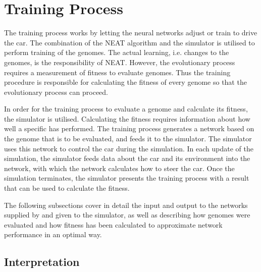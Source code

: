 \section{Training Process}
The training process works by letting the neural networks adjust or train to drive the car. The combination of the NEAT algorithm and the simulator is utilised to perform training of the genomes. The actual learning, i.e. changes to the genomes, is the responsibility of NEAT. However, the evolutionary process requires a measurement of fitness to evaluate genomes. Thus the training procedure is responsible for calculating the fitness of every genome so that the evolutionary process can proceed. 

In order for the training process to evaluate a genome and calculate its fitness, the simulator is utilised. Calculating the fitness requires information about how well a specific has performed. The training process generates a network based on the genome that is to be evaluated, and feeds it to the simulator. The simulator uses this network to control the car during the simulation. In each update of the simulation, the simulator feeds data about the car and its environment into the network, with which the network calculates how to steer the car. Once the simulation terminates, the simulator presents the training process with a result that can be used to calculate the fitness.

The following subsections cover in detail the input and output to the networks supplied by and given to the simulator, as well as describing how genomes were evaluated and how fitness has been calculated to approximate network performance in an optimal way.

\subsection{Interpretation}
\label{method:interpretation}

